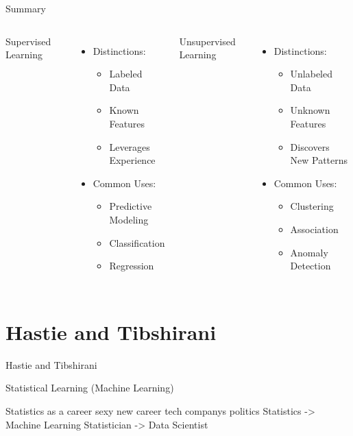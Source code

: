 \documentclass{beamer}
\begin{document}
\begin{frame}{Summary}
	\begin{columns}
		Supervised Learning
		\begin{itemize}
			\item[] Distinctions:
			\begin{itemize}
				\item Labeled Data
				\item Known Features
				\item Leverages Experience
			\end{itemize}
			\item[] Common Uses:
			\begin{itemize}
				\item Predictive Modeling
				\item Classification
				\item Regression
			\end{itemize}
		\end{itemize}
		Unsupervised Learning
		\begin{itemize}
			\item[] Distinctions:
			\begin{itemize}
				\item Unlabeled Data
				\item Unknown Features
				\item Discovers New Patterns
			\end{itemize}
			\item[] Common Uses:
			\begin{itemize}
				\item Clustering
				\item Association
				\item Anomaly Detection
			\end{itemize}
		\end{itemize}
	\end{columns}
\end{frame}

\section{Hastie and Tibshirani}

\begin{frame}{Hastie and Tibshirani}

Statistical Learning (Machine Learning)

Statistics as a career
	sexy new career
	tech companys
	politics
Statistics -> Machine Learning
Statistician -> Data Scientist

\end{frame}
\end{document}

